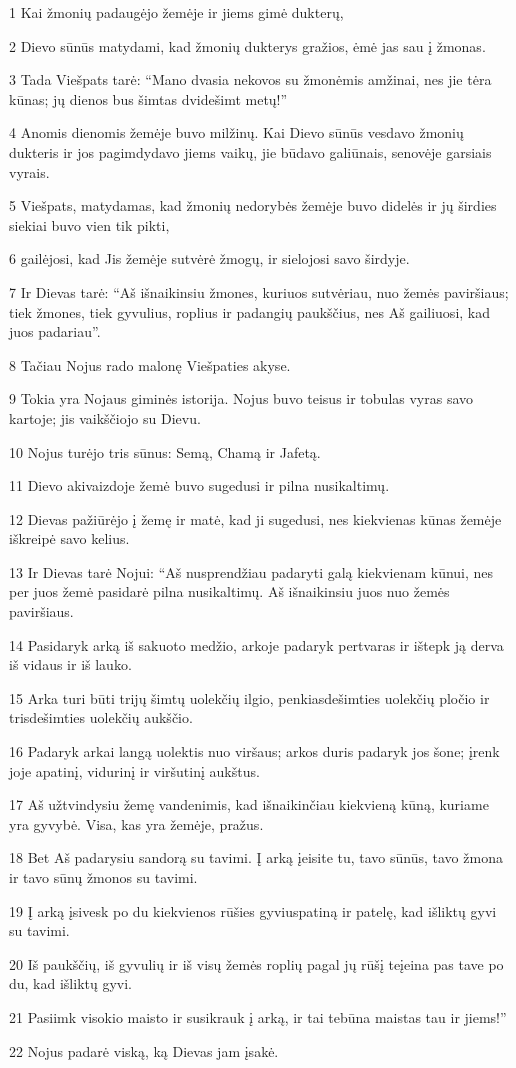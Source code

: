 \par 1 Kai žmonių padaugėjo žemėje ir jiems gimė dukterų, 
\par 2 Dievo sūnūs matydami, kad žmonių dukterys gražios, ėmė jas sau į žmonas. 
\par 3 Tada Viešpats tarė: “Mano dvasia nekovos su žmonėmis amžinai, nes jie tėra kūnas; jų dienos bus šimtas dvidešimt metų!” 
\par 4 Anomis dienomis žemėje buvo milžinų. Kai Dievo sūnūs vesdavo žmonių dukteris ir jos pagimdydavo jiems vaikų, jie būdavo galiūnais, senovėje garsiais vyrais. 
\par 5 Viešpats, matydamas, kad žmonių nedorybės žemėje buvo didelės ir jų širdies siekiai buvo vien tik pikti, 
\par 6 gailėjosi, kad Jis žemėje sutvėrė žmogų, ir sielojosi savo širdyje. 
\par 7 Ir Dievas tarė: “Aš išnaikinsiu žmones, kuriuos sutvėriau, nuo žemės paviršiaus; tiek žmones, tiek gyvulius, roplius ir padangių paukščius, nes Aš gailiuosi, kad juos padariau”. 
\par 8 Tačiau Nojus rado malonę Viešpaties akyse. 
\par 9 Tokia yra Nojaus giminės istorija. Nojus buvo teisus ir tobulas vyras savo kartoje; jis vaikščiojo su Dievu. 
\par 10 Nojus turėjo tris sūnus: Semą, Chamą ir Jafetą. 
\par 11 Dievo akivaizdoje žemė buvo sugedusi ir pilna nusikaltimų. 
\par 12 Dievas pažiūrėjo į žemę ir matė, kad ji sugedusi, nes kiekvienas kūnas žemėje iškreipė savo kelius. 
\par 13 Ir Dievas tarė Nojui: “Aš nusprendžiau padaryti galą kiekvienam kūnui, nes per juos žemė pasidarė pilna nusikaltimų. Aš išnaikinsiu juos nuo žemės paviršiaus. 
\par 14 Pasidaryk arką iš sakuoto medžio, arkoje padaryk pertvaras ir ištepk ją derva iš vidaus ir iš lauko. 
\par 15 Arka turi būti trijų šimtų uolekčių ilgio, penkiasdešimties uolekčių pločio ir trisdešimties uolekčių aukščio. 
\par 16 Padaryk arkai langą uolektis nuo viršaus; arkos duris padaryk jos šone; įrenk joje apatinį, vidurinį ir viršutinį aukštus. 
\par 17 Aš užtvindysiu žemę vandenimis, kad išnaikinčiau kiekvieną kūną, kuriame yra gyvybė. Visa, kas yra žemėje, pražus. 
\par 18 Bet Aš padarysiu sandorą su tavimi. Į arką įeisite tu, tavo sūnūs, tavo žmona ir tavo sūnų žmonos su tavimi. 
\par 19 Į arką įsivesk po du kiekvienos rūšies gyvius­patiną ir patelę, kad išliktų gyvi su tavimi. 
\par 20 Iš paukščių, iš gyvulių ir iš visų žemės roplių pagal jų rūšį teįeina pas tave po du, kad išliktų gyvi. 
\par 21 Pasiimk visokio maisto ir susikrauk į arką, ir tai tebūna maistas tau ir jiems!” 
\par 22 Nojus padarė viską, ką Dievas jam įsakė.



